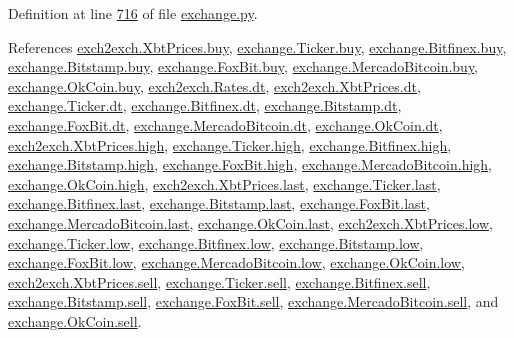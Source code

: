 Definition at line \hyperlink{exchange_8py_source_l00716}{716} of file \hyperlink{exchange_8py_source}{exchange.\+py}.



References \hyperlink{exch2exch_8py_source_l00059}{exch2exch.\+Xbt\+Prices.\+buy}, \hyperlink{exchange_8py_source_l00060}{exchange.\+Ticker.\+buy}, \hyperlink{exchange_8py_source_l00430}{exchange.\+Bitfinex.\+buy}, \hyperlink{exchange_8py_source_l00502}{exchange.\+Bitstamp.\+buy}, \hyperlink{exchange_8py_source_l00574}{exchange.\+Fox\+Bit.\+buy}, \hyperlink{exchange_8py_source_l00642}{exchange.\+Mercado\+Bitcoin.\+buy}, \hyperlink{exchange_8py_source_l00707}{exchange.\+Ok\+Coin.\+buy}, \hyperlink{exch2exch_8py_source_l00028}{exch2exch.\+Rates.\+dt}, \hyperlink{exch2exch_8py_source_l00057}{exch2exch.\+Xbt\+Prices.\+dt}, \hyperlink{exchange_8py_source_l00059}{exchange.\+Ticker.\+dt}, \hyperlink{exchange_8py_source_l00437}{exchange.\+Bitfinex.\+dt}, \hyperlink{exchange_8py_source_l00509}{exchange.\+Bitstamp.\+dt}, \hyperlink{exchange_8py_source_l00573}{exchange.\+Fox\+Bit.\+dt}, \hyperlink{exchange_8py_source_l00649}{exchange.\+Mercado\+Bitcoin.\+dt}, \hyperlink{exchange_8py_source_l00714}{exchange.\+Ok\+Coin.\+dt}, \hyperlink{exch2exch_8py_source_l00061}{exch2exch.\+Xbt\+Prices.\+high}, \hyperlink{exchange_8py_source_l00062}{exchange.\+Ticker.\+high}, \hyperlink{exchange_8py_source_l00432}{exchange.\+Bitfinex.\+high}, \hyperlink{exchange_8py_source_l00504}{exchange.\+Bitstamp.\+high}, \hyperlink{exchange_8py_source_l00576}{exchange.\+Fox\+Bit.\+high}, \hyperlink{exchange_8py_source_l00644}{exchange.\+Mercado\+Bitcoin.\+high}, \hyperlink{exchange_8py_source_l00709}{exchange.\+Ok\+Coin.\+high}, \hyperlink{exch2exch_8py_source_l00063}{exch2exch.\+Xbt\+Prices.\+last}, \hyperlink{exchange_8py_source_l00064}{exchange.\+Ticker.\+last}, \hyperlink{exchange_8py_source_l00434}{exchange.\+Bitfinex.\+last}, \hyperlink{exchange_8py_source_l00506}{exchange.\+Bitstamp.\+last}, \hyperlink{exchange_8py_source_l00578}{exchange.\+Fox\+Bit.\+last}, \hyperlink{exchange_8py_source_l00646}{exchange.\+Mercado\+Bitcoin.\+last}, \hyperlink{exchange_8py_source_l00711}{exchange.\+Ok\+Coin.\+last}, \hyperlink{exch2exch_8py_source_l00062}{exch2exch.\+Xbt\+Prices.\+low}, \hyperlink{exchange_8py_source_l00063}{exchange.\+Ticker.\+low}, \hyperlink{exchange_8py_source_l00433}{exchange.\+Bitfinex.\+low}, \hyperlink{exchange_8py_source_l00505}{exchange.\+Bitstamp.\+low}, \hyperlink{exchange_8py_source_l00577}{exchange.\+Fox\+Bit.\+low}, \hyperlink{exchange_8py_source_l00645}{exchange.\+Mercado\+Bitcoin.\+low}, \hyperlink{exchange_8py_source_l00710}{exchange.\+Ok\+Coin.\+low}, \hyperlink{exch2exch_8py_source_l00058}{exch2exch.\+Xbt\+Prices.\+sell}, \hyperlink{exchange_8py_source_l00061}{exchange.\+Ticker.\+sell}, \hyperlink{exchange_8py_source_l00431}{exchange.\+Bitfinex.\+sell}, \hyperlink{exchange_8py_source_l00503}{exchange.\+Bitstamp.\+sell}, \hyperlink{exchange_8py_source_l00575}{exchange.\+Fox\+Bit.\+sell}, \hyperlink{exchange_8py_source_l00643}{exchange.\+Mercado\+Bitcoin.\+sell}, and \hyperlink{exchange_8py_source_l00708}{exchange.\+Ok\+Coin.\+sell}.


